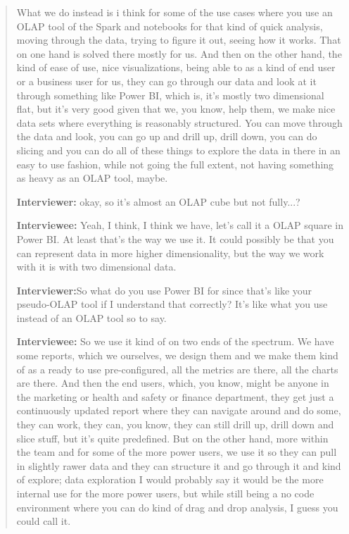 \begin{quote}
    What we do instead is i think for some of the use cases where you use an OLAP tool of the Spark and notebooks for that kind of quick analysis, moving through the data, trying to figure it out, seeing how it works.
    That on one hand is solved there mostly for us.
    And then on the other hand, the kind of ease of use, nice visualizations, being able to as a kind of end user or a business user for us, they can go through our data and look at it through something like Power BI, which is, it's mostly two dimensional flat, but it's very good given that we, you know, help them, we make nice data sets where everything is reasonably structured.
    You can move through the data and look, you can go up and drill up, drill down, you can do slicing and you can do all of these things to explore the data in there in an easy to use fashion, while not going the full extent, not having something as heavy as an OLAP tool, maybe.

    \textbf{Interviewer:} okay, so it's almost an OLAP cube but not fully...?

    \textbf{Interviewee:} Yeah, I think, I think we have, let's call it a OLAP square in Power BI.
    At least that's the way we use it.
    It could possibly be that you can represent data in more higher dimensionality, but the way we work with it is with two dimensional data.

    \textbf{Interviewer:}So what do you use Power BI for since that's like your pseudo-OLAP tool if I understand that correctly? It's like what you use instead of an OLAP tool so to say.

    \textbf{Interviewee:} So we use it kind of on two ends of the spectrum.
    We have some reports, which we ourselves, we design them and we make them kind of as a ready to use pre-configured, all the metrics are there, all the charts are there. 
    And then the end users, which, you know, might be anyone in the marketing or health and safety or finance department, they get just a continuously updated report where they can navigate around and do some, they can work, they can, you know, they can still drill up, drill down and slice stuff, but it's quite predefined.
    But on the other hand, more within the team and for some of the more power users, we use it so they can pull in slightly rawer data and they can structure it and go through it and kind of explore; data exploration I would probably say it would be the more internal use for the more power users, but while still being a no code environment where you can do kind of drag and drop analysis, I guess you could call it.


\end{quote}
